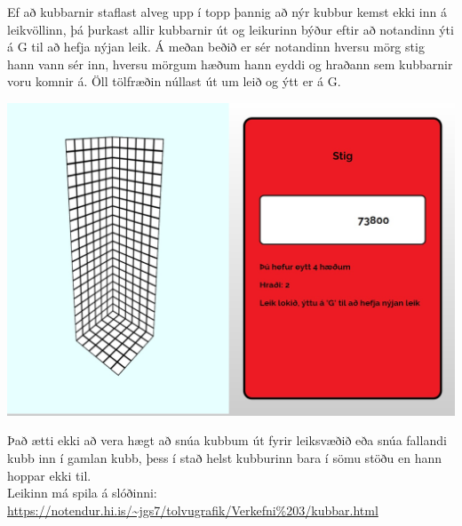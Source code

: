 \documentclass[12pt]{article}
\begin{document}
\begin{small}
\begin{center}
\end{center}
Ef að kubbarnir staflast alveg upp í topp þannig að nýr kubbur kemst ekki inn á leikvöllinn, þá þurkast allir kubbarnir út og leikurinn býður eftir að notandinn ýti á G til að hefja nýjan leik. Á meðan beðið er sér notandinn hversu mörg stig hann vann sér inn, hversu mörgum hæðum hann eyddi og hraðann sem kubbarnir voru komnir á. Öll tölfræðin núllast út um leið og ýtt er á G.
\begin{center}
\includegraphics[scale=0.4]{m8}
\end{center}
Það ætti ekki að vera hægt að snúa kubbum út fyrir leiksvæðið eða snúa fallandi kubb inn í gamlan kubb, þess í stað helst kubburinn bara í sömu stöðu en hann hoppar ekki til.\\

Leikinn má spila á slóðinni:
\url{https://notendur.hi.is/~jgs7/tolvugrafik/Verkefni%203/kubbar.html}


\end{small}
\end{document}
